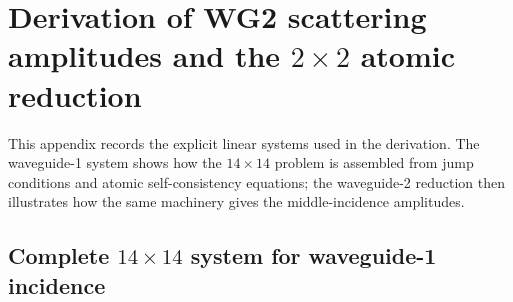 \documentclass[aps,pra,reprint,superscriptaddress,nofootinbib,longbibliography,floatfix]{revtex4-2}
\begin{document}
\section{\texorpdfstring{Derivation of WG2 scattering amplitudes and the $2\times2$ atomic reduction}{Derivation of WG2 scattering amplitudes and the 2x2 atomic reduction}}
\label{app:derivation}

This appendix records the explicit linear systems used in the derivation.
The waveguide-1 system shows how the $14\times14$ problem is assembled from jump conditions and atomic self-consistency equations; the waveguide-2 reduction then illustrates how the same machinery gives the middle-incidence amplitudes.

\subsection{\texorpdfstring{Complete $14\times14$ system for waveguide-1 incidence}{Complete 14x14 system for waveguide-1 incidence}}
\end{document}

